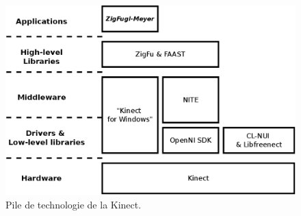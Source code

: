 \begin{figure}[h!]
\centering
\includegraphics[width=0.9\linewidth]{images/technology_overview}
\caption{Pile de technologie de la Kinect.}
\label{fig:technology_overview}
\end{figure}
